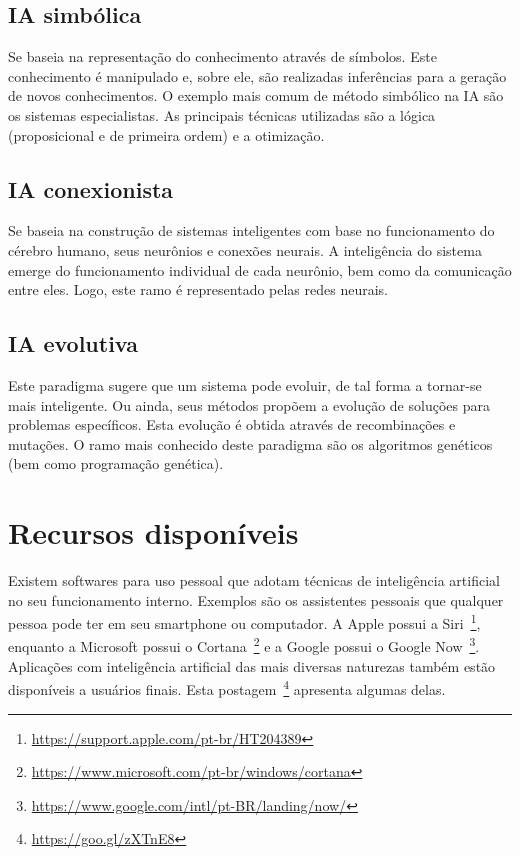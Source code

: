\subsection{IA simbólica}
Se baseia na representação do conhecimento através de símbolos. Este conhecimento é manipulado e, sobre ele, são realizadas inferências para a geração de novos conhecimentos. O exemplo mais comum de método simbólico na IA são os sistemas especialistas. As principais técnicas utilizadas são a lógica (proposicional e de primeira ordem) e a otimização.

\subsection{IA conexionista}
Se baseia na construção de sistemas inteligentes com base no funcionamento do cérebro humano, seus neurônios e conexões neurais. A inteligência do sistema emerge do funcionamento individual de cada neurônio, bem como da comunicação entre eles. Logo, este ramo é representado pelas redes neurais.

\subsection{IA evolutiva}
Este paradigma sugere que um sistema pode evoluir, de tal forma a tornar-se mais inteligente. Ou ainda, seus métodos propõem a evolução de soluções para problemas específicos. Esta evolução é obtida através de recombinações e mutações. O ramo mais conhecido deste paradigma são os algoritmos genéticos (bem como programação genética).

\section{Recursos disponíveis}

Existem softwares para uso pessoal que adotam técnicas de inteligência artificial no seu funcionamento interno. Exemplos são os assistentes pessoais que qualquer pessoa pode ter em seu smartphone ou computador. A Apple possui a Siri~\footnote{\url{https://support.apple.com/pt-br/HT204389}}, enquanto a Microsoft possui o Cortana~\footnote{\url{https://www.microsoft.com/pt-br/windows/cortana}} e a Google possui o Google Now~\footnote{\url{https://www.google.com/intl/pt-BR/landing/now/}}. Aplicações com inteligência artificial das mais diversas naturezas também estão disponíveis a usuários finais. Esta postagem~\footnote{\url{https://goo.gl/zXTnE8}} apresenta algumas delas.

